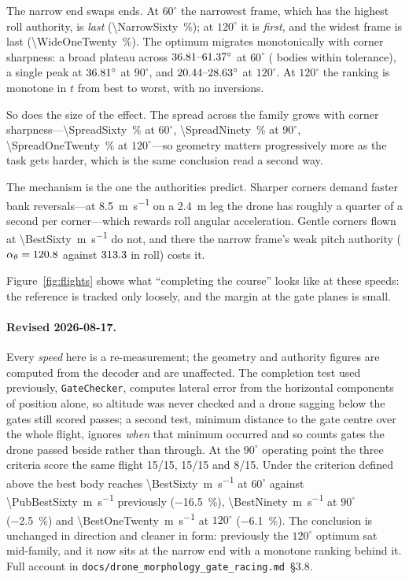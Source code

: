 \documentclass[11pt,a4paper]{article}
\begin{document}
The narrow end swaps ends. At $60^\circ$ the narrowest frame, which has the
highest roll authority, is \emph{last} (\SI{\NarrowSixty}{\percent}); at
$120^\circ$ it is \emph{first}, and the widest frame is last
(\SI{\WideOneTwenty}{\percent}). The optimum migrates monotonically with corner
sharpness: a broad plateau across $36.81\text{--}61.37^\circ$ at $60^\circ$
(\NTiesSixty{} bodies within tolerance), a single peak at
$36.81^\circ$ at $90^\circ$, and $20.44\text{--}28.63^\circ$ at
$120^\circ$. At $120^\circ$ the ranking is monotone in $t$ from best to worst,
with no inversions.

So does the size of the effect. The spread across the family grows with corner
sharpness---\SI{\SpreadSixty}{\percent} at $60^\circ$,
\SI{\SpreadNinety}{\percent} at $90^\circ$, \SI{\SpreadOneTwenty}{\percent} at
$120^\circ$---so geometry matters progressively more as the task gets harder,
which is the same conclusion read a second way.

The mechanism is the one the authorities predict. Sharper corners demand faster
bank reversals---at \SI{8.5}{\metre\per\second} on a \SI{2.4}{\metre} leg the
drone has roughly a quarter of a second per corner---which rewards roll angular
acceleration. Gentle corners flown at \SI{\BestSixty}{\metre\per\second} do not,
and there the narrow frame's weak pitch authority
($\alpha_\theta=\num{120.8}$ against $\num{313.3}$ in roll) costs
it.

Figure~\ref{fig:flights} shows what ``completing the course'' looks like at
these speeds: the reference is tracked only loosely, and the margin at the gate
planes is small.

\paragraph{Revised 2026-08-17.} Every \emph{speed} here is a re-measurement;
the geometry and authority figures are computed from the decoder and are
unaffected. The
completion test used previously, \texttt{GateChecker}, computes lateral error
from the horizontal components of position alone, so altitude was never checked
and a drone sagging below the gates still scored passes; a second test, minimum
distance to the gate centre over the whole flight, ignores \emph{when} that
minimum occurred and so counts gates the drone passed beside rather than
through. At the $90^\circ$ operating point the three criteria score the same
flight 15/15, 15/15 and 8/15. Under the criterion defined above the best body
reaches \SI{\BestSixty}{\metre\per\second} at $60^\circ$ against
\SI{\PubBestSixty}{\metre\per\second} previously (\SI{-16.5}{\percent}),
\SI{\BestNinety}{\metre\per\second} at $90^\circ$ (\SI{-2.5}{\percent}) and
\SI{\BestOneTwenty}{\metre\per\second} at $120^\circ$ (\SI{-6.1}{\percent}).
The conclusion is unchanged in direction and cleaner in form: previously the
$120^\circ$ optimum sat mid-family, and it now sits at the narrow end with a
monotone ranking behind it. Full account in
\texttt{docs/drone\_morphology\_gate\_racing.md}~\S3.8.
\end{document}
